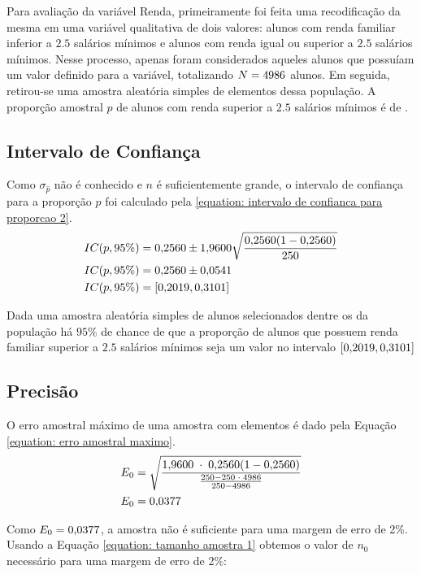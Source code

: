 

Para avaliação da variável Renda, primeiramente foi feita uma recodificação
da mesma em uma variável qualitativa de dois valores: alunos com renda
familiar inferior a $\num{2,5}$ salários mínimos e alunos com renda igual ou
superior a $\num{2,5}$ salários mínimos. Nesse processo, apenas foram considerados
aqueles alunos que possuíam um valor definido para a variável, totalizando
$N=4986$ alunos. Em seguida, retirou-se uma amostra aleatória simples de
\SEISn elementos dessa população. A proporção amostral $\hat{p}$ de alunos
com renda superior a $\num{2.5}$ salários mínimos é de \SEISpAmostral.

\subsection{Intervalo de Confiança}

	Como $\sigma_{\hat{p}}$ não é conhecido e $n$ é suficientemente grande,
	o intervalo de confiança para a proporção $p$ foi calculado pela
	\autoref{equation: intervalo de confianca para proporcao 2}.
	\begin{align*}
		IC(p, 95\%) &= \num{0.256} \pm \num{1.96} \sqrt{\frac{\num{0.256} (1- \num{0.256})}{250}} \\
		IC(p, 95\%) &= \num{0.256} \pm \num{0.054099409} \\
		IC(p, 95\%) &= [\num{0.201900591}, \num{0.310099409}]
	\end{align*}

	Dada uma amostra aleatória simples de \SEISn alunos
	selecionados dentre os \SEISN da população há $95\%$ de chance de que a
	proporção de alunos que possuem renda familiar superior a $\num{2,5}$ salários
	mínimos seja um valor no intervalo $[\SEISAICinf, \SEISAICsup]$

\subsection{Precisão}

	O erro amostral máximo de uma amostra com \SEISn elementos é dado pela
	Equação \ref{equation: erro amostral maximo}.
	\begin{align*}
		E_0 &= \sqrt{\frac{\num{1.96} \;\cdot\; \num{0.256} (1 - \num{0.256}) }{\frac{250 - 250 \;\cdot\; 4986}{250 - 4986}}} \\
		E_0 &= \num{0.037664981}
	\end{align*}

	Como $E_0 = \SEISBE$, a amostra não é suficiente para uma margem de erro
	de 2\%. Usando a Equação \ref{equation: tamanho amostra 1} obtemos o
	valor de $n_0$ necessário para uma margem de erro de 2\%:

